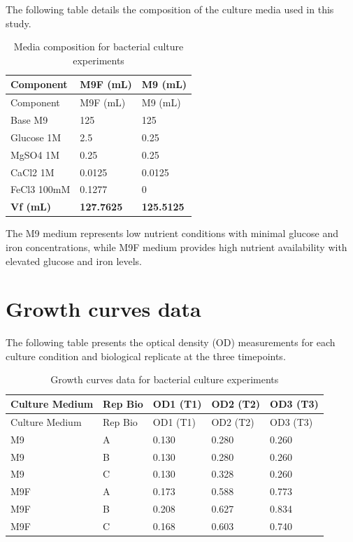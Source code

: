 \documentclass[
  11pt,
  a4paper,
]{report}
\begin{document}
The following table details the composition of the culture media used in
this study.

\begin{longtable}[]{@{}lll@{}}
\caption{Media composition for bacterial culture
experiments}\label{tbl-media}\tabularnewline
\toprule\noalign{}
Component & M9F (mL) & M9 (mL) \\
\midrule\noalign{}
\endfirsthead
\toprule\noalign{}
Component & M9F (mL) & M9 (mL) \\
\midrule\noalign{}
\endhead
\bottomrule\noalign{}
\endlastfoot
Base M9 & 125 & 125 \\
Glucose 1M & 2.5 & 0.25 \\
MgSO4 1M & 0.25 & 0.25 \\
CaCl2 1M & 0.0125 & 0.0125 \\
FeCl3 100mM & 0.1277 & 0 \\
\textbf{Vf (mL)} & \textbf{127.7625} & \textbf{125.5125} \\
\end{longtable}

The M9 medium represents low nutrient conditions with minimal glucose
and iron concentrations, while M9F medium provides high nutrient
availability with elevated glucose and iron levels.

\section{Growth curves data}\label{sec-appendix-growth}

The following table presents the optical density (OD) measurements for
each culture condition and biological replicate at the three timepoints.

\begin{longtable}[]{@{}lllll@{}}
\caption{Growth curves data for bacterial culture
experiments}\label{tbl-growth-curves}\tabularnewline
\toprule\noalign{}
Culture Medium & Rep Bio & OD1 (T1) & OD2 (T2) & OD3 (T3) \\
\midrule\noalign{}
\endfirsthead
\toprule\noalign{}
Culture Medium & Rep Bio & OD1 (T1) & OD2 (T2) & OD3 (T3) \\
\midrule\noalign{}
\endhead
\bottomrule\noalign{}
\endlastfoot
M9 & A & 0.130 & 0.280 & 0.260 \\
M9 & B & 0.130 & 0.280 & 0.260 \\
M9 & C & 0.130 & 0.328 & 0.260 \\
M9F & A & 0.173 & 0.588 & 0.773 \\
M9F & B & 0.208 & 0.627 & 0.834 \\
M9F & C & 0.168 & 0.603 & 0.740 \\
\end{longtable}
\end{document}
